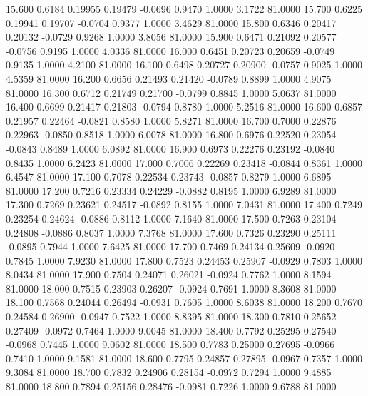   15.600   0.6184   0.19955   0.19479  -0.0696   0.9470   1.0000   3.1722  81.0000
  15.700   0.6225   0.19941   0.19707  -0.0704   0.9377   1.0000   3.4629  81.0000
  15.800   0.6346   0.20417   0.20132  -0.0729   0.9268   1.0000   3.8056  81.0000
  15.900   0.6471   0.21092   0.20577  -0.0756   0.9195   1.0000   4.0336  81.0000
  16.000   0.6451   0.20723   0.20659  -0.0749   0.9135   1.0000   4.2100  81.0000
  16.100   0.6498   0.20727   0.20900  -0.0757   0.9025   1.0000   4.5359  81.0000
  16.200   0.6656   0.21493   0.21420  -0.0789   0.8899   1.0000   4.9075  81.0000
  16.300   0.6712   0.21749   0.21700  -0.0799   0.8845   1.0000   5.0637  81.0000
  16.400   0.6699   0.21417   0.21803  -0.0794   0.8780   1.0000   5.2516  81.0000
  16.600   0.6857   0.21957   0.22464  -0.0821   0.8580   1.0000   5.8271  81.0000
  16.700   0.7000   0.22876   0.22963  -0.0850   0.8518   1.0000   6.0078  81.0000
  16.800   0.6976   0.22520   0.23054  -0.0843   0.8489   1.0000   6.0892  81.0000
  16.900   0.6973   0.22276   0.23192  -0.0840   0.8435   1.0000   6.2423  81.0000
  17.000   0.7006   0.22269   0.23418  -0.0844   0.8361   1.0000   6.4547  81.0000
  17.100   0.7078   0.22534   0.23743  -0.0857   0.8279   1.0000   6.6895  81.0000
  17.200   0.7216   0.23334   0.24229  -0.0882   0.8195   1.0000   6.9289  81.0000
  17.300   0.7269   0.23621   0.24517  -0.0892   0.8155   1.0000   7.0431  81.0000
  17.400   0.7249   0.23254   0.24624  -0.0886   0.8112   1.0000   7.1640  81.0000
  17.500   0.7263   0.23104   0.24808  -0.0886   0.8037   1.0000   7.3768  81.0000
  17.600   0.7326   0.23290   0.25111  -0.0895   0.7944   1.0000   7.6425  81.0000
  17.700   0.7469   0.24134   0.25609  -0.0920   0.7845   1.0000   7.9230  81.0000
  17.800   0.7523   0.24453   0.25907  -0.0929   0.7803   1.0000   8.0434  81.0000
  17.900   0.7504   0.24071   0.26021  -0.0924   0.7762   1.0000   8.1594  81.0000
  18.000   0.7515   0.23903   0.26207  -0.0924   0.7691   1.0000   8.3608  81.0000
  18.100   0.7568   0.24044   0.26494  -0.0931   0.7605   1.0000   8.6038  81.0000
  18.200   0.7670   0.24584   0.26900  -0.0947   0.7522   1.0000   8.8395  81.0000
  18.300   0.7810   0.25652   0.27409  -0.0972   0.7464   1.0000   9.0045  81.0000
  18.400   0.7792   0.25295   0.27540  -0.0968   0.7445   1.0000   9.0602  81.0000
  18.500   0.7783   0.25000   0.27695  -0.0966   0.7410   1.0000   9.1581  81.0000
  18.600   0.7795   0.24857   0.27895  -0.0967   0.7357   1.0000   9.3084  81.0000
  18.700   0.7832   0.24906   0.28154  -0.0972   0.7294   1.0000   9.4885  81.0000
  18.800   0.7894   0.25156   0.28476  -0.0981   0.7226   1.0000   9.6788  81.0000
